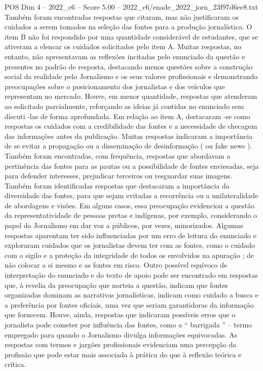 \begin{textsample}{POS Dim 4 – 2022\_c6 – Score 5.00 – 2022\_c6/enade\_2022\_jorn\_23f97d6ee8.txt}
Também foram encontradas respostas que citaram, mas não justificaram os cuidados a serem tomados na seleção das fontes para a produção jornalística.
O item B não foi respondido por uma quantidade considerável de estudantes, que se ativeram a elencar os cuidados solicitados pelo item A.
Muitas respostas, no entanto, não apresentavam as reflexões incitadas pelo enunciado da questão e presentes no padrão de resposta, destacando menos questões sobre a construção social da realidade pelo Jornalismo e os seus valores profissionais e demonstrando preocupações sobre o posicionamento dos jornalistas e dos veículos que representam no mercado.
Houve, em menor quantidade, respostas que atenderam ao solicitado parcialmente, reforçando as ideias já contidas no enunciado sem discuti -las de forma aprofundada.
Em relação ao item A, destacaram -se como respostas os cuidados com a credibilidade das fontes e a necessidade de checagem das informações antes da publicação.
Muitas respostas indicaram a importância de se evitar a propagação ou a disseminação de desinformação ( ou fake news ).
Também foram encontradas, com frequência, respostas que abordavam a pertinência das fontes para as pautas ou a possibilidade de fontes enviesadas, seja para defender interesses, prejudicar terceiros ou resguardar suas imagens.
Também foram identificadas respostas que destacaram a importância da diversidade das fontes, para que sejam evitadas a recorrência ou a unilateralidade de abordagens e visões.
Em alguns casos, essa preocupação evidenciou a questão da representatividade de pessoas pretas e indígenas, por exemplo, considerando o papel do Jornalismo em dar voz a públicos, por vezes, minorizados.
Algumas respostas aparentam ter sido influenciadas por um erro de leitura do enunciado e exploraram cuidados que os jornalistas devem ter com as fontes, como o cuidado com o sigilo e a proteção da integridade de todos os envolvidos na apuração ; de não colocar a si mesmo e as fontes em risco.
Outro possível equívoco de interpretação do enunciado e do texto de apoio pode ser encontrado em respostas que, à revelia da preocupação que norteia a questão, indicam que fontes organizadas dominam as narrativas jornalísticas, indicam como cuidado a busca e a preferência por fontes oficiais, uma vez que seriam garantidoras da informação que fornecem.
Houve, ainda, respostas que indicaram possíveis erros que o jornalista pode cometer por influência das fontes, como a “ barrigada ” – termo empregado para quando o Jornalismo divulga informações equivocadas.
As respostas com termos e jargões profissionais evidenciam uma percepção da profissão que pode estar mais associada à prática do que à reflexão teórica e crítica.

\end{textsample}
